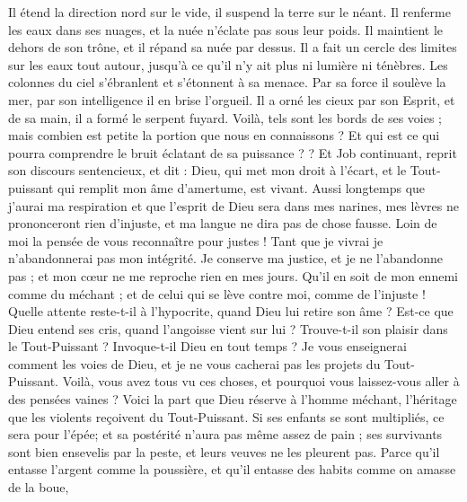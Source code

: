 \begin{multicols}{2}
Il étend la direction nord sur le vide, il suspend la terre sur le néant.
Il renferme les eaux dans ses nuages, et la nuée n'éclate pas sous leur poids.
Il maintient le dehors de son trône, et il répand sa nuée par dessus.
Il a fait un cercle des limites sur les eaux tout autour, jusqu'à ce qu'il n'y ait plus ni lumière ni ténèbres.
Les colonnes du ciel s'ébranlent et s'étonnent à sa menace.
Par sa force il soulève la mer, par son intelligence il en brise l'orgueil.
Il a orné les cieux par son Esprit, et  de sa main, il a formé le serpent fuyard.
Voilà, tels sont les bords de ses voies ; mais combien est petite la portion que nous en connaissons ? Et qui est ce qui pourra comprendre le bruit éclatant de sa puissance ? ?
\VerseOne{}Et Job continuant, reprit son discours sentencieux, et dit :
Dieu, qui met mon droit à l'écart, et le Tout-puissant qui remplit mon âme d'amertume, est vivant.
Aussi longtemps que j'aurai ma respiration et que l'esprit de Dieu sera dans mes narines,
mes lèvres ne prononceront rien d'injuste, et ma langue ne dira pas de chose fausse.
Loin de moi la pensée de vous reconnaître pour justes ! Tant que je vivrai je n'abandonnerai pas mon intégrité.
Je conserve ma justice, et je ne l'abandonne pas ; et mon cœur ne me reproche rien en mes jours.
Qu'il en soit de mon ennemi comme du méchant ; et de celui qui se lève contre moi, comme de l'injuste !
Quelle attente reste-t-il à l'hypocrite, quand Dieu lui retire son âme ?
Est-ce que Dieu entend ses cris, quand l'angoisse vient sur lui ?
Trouve-t-il son plaisir dans le Tout-Puissant ? Invoque-t-il Dieu en tout temps ?
Je vous enseignerai comment les voies de Dieu, et je ne vous cacherai pas les projets du Tout-Puissant.
Voilà, vous avez tous vu ces choses, et pourquoi vous laissez-vous aller à des pensées vaines ?
Voici la part que Dieu réserve à l'homme méchant, l'héritage que les violents reçoivent du Tout-Puissant.
Si ses enfants se sont multipliés, ce sera pour l'épée; et sa postérité n'aura pas même assez de pain ;
ses survivants sont bien ensevelis par la peste, et leurs veuves ne les pleurent pas.
Parce qu’il entasse l'argent comme la poussière, et qu'il entasse des habits comme on amasse de la boue,

\end{multicols}
